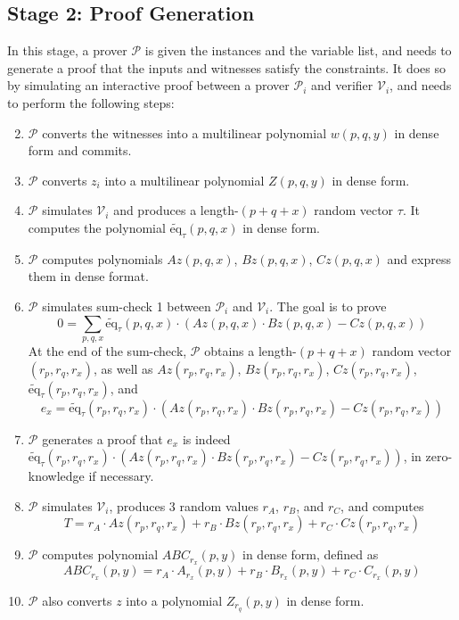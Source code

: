 \documentclass{article}
\renewcommand{\P}{\mathcal{P}}
\newcommand{\V}{\mathcal{V}}
\newcommand{\eq}{\widetilde{\mbox{eq}}}
\begin{document}
\subsection{Stage 2: Proof Generation}\label{stage:prover}
In this stage, a prover $\P$ is given the instances and the variable list, and needs to generate a proof that the inputs and witnesses satisfy the constraints. It does so by simulating an interactive proof between a prover $\P_i$ and verifier $\V_i$, and needs to perform the following steps:
\begin{enumerate}
    \setcounter{enumi}{1}
    \item $\P$ converts the witnesses into a multilinear polynomial $w(p, q, y)$ in dense form and commits.\label{step:witness-commit}
    \item $\P$ converts $z_i$ into a multilinear polynomial $Z(p, q, y)$ in dense form.
    \item $\P$ simulates $\V_i$ and produces a length-$(p + q + x)$ random vector $\tau$. It computes the polynomial $\eq_{\tau}(p, q, x)$ in dense form.\label{step:produce-eq-tau}
    \item $\P$ computes polynomials $Az(p, q, x)$, $Bz(p, q, x)$, $Cz(p, q, x)$ and express them in dense format.\label{step:mat-product}
    \item $\P$ simulates sum-check 1 between $\P_i$ and $\V_i$. The goal is to prove
    $$\displaystyle0 =\sum_{p, q, x} \eq_\tau(p, q, x)\cdot (Az(p, q, x)\cdot Bz(p, q, x) - Cz(p, q, x))$$
    At the end of the sum-check, $\P$ obtains a length-$(p + q + x)$ random vector $(r_p, r_q, r_x)$, as well as $Az(r_p, r_q, r_x)$, $Bz(r_p, r_q, r_x)$, $Cz(r_p, r_q, r_x)$, $\eq_\tau(r_p, r_q, r_x)$, and
    $$e_x = \eq_\tau(r_p, r_q, r_x)\cdot (Az(r_p, r_q, r_x)\cdot Bz(r_p, r_q, r_x) - Cz(r_p, r_q, r_x))$$\label{step:sumcheck-1}
    \item $\P$ generates a proof that $e_x$ is indeed $\eq_\tau(r_p, r_q, r_x)\cdot (Az(r_p, r_q, r_x)\cdot Bz(r_p, r_q, r_x) - Cz(r_p, r_q, r_x))$, in zero-knowledge if necessary.\label{step:p_proof_1}
    \item $\P$ simulates $\V_i$, produces 3 random values $r_A$, $r_B$, and $r_C$, and computes 
    $$T = r_A\cdot Az(r_p, r_q, r_x) + r_B\cdot Bz(r_p, r_q, r_x) + r_C\cdot Cz(r_p, r_q, r_x)$$
    \item $\P$ computes polynomial $ABC_{r_x}(p, y)$ in dense form, defined as
    $$ABC_{r_x}(p, y) = r_A\cdot A_{r_x}(p, y) + r_B\cdot B_{r_x}(p, y) + r_C\cdot C_{r_x}(p, y)$$
    \item $\P$ also converts $z$ into a polynomial $Z_{r_q}(p, y)$ in dense form.\label{step:compute-z-poly}

\end{enumerate}
\end{document}
